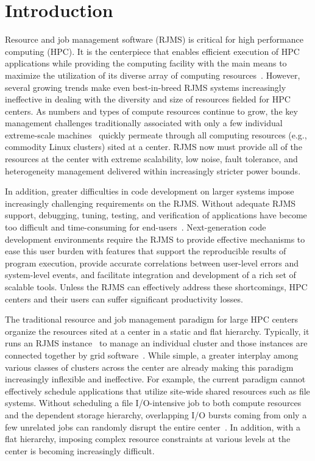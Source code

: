 \section{Introduction}

Resource and job management software (RJMS) is critical
for high performance computing (HPC).
It is the centerpiece that enables efficient
execution of HPC applications while providing
the computing facility with the main means
to maximize the utilization of its diverse array 
of computing resources~\cite{GeorgiouThesis}.
However, several growing trends make even
best-in-breed RJMS systems increasingly
ineffective in dealing with the diversity and size 
of resources fielded for HPC centers.
As numbers and types of compute resources
continue to grow, the key management challenges 
traditionally associated with only a few individual 
extreme-scale machines~\cite{sequoia,titan} 
quickly permeate through all computing resources 
(e.g., commodity Linux clusters) 
sited at a center. 
RJMS now must provide all of the resources at the center
with extreme scalability, low noise, fault tolerance, 
and heterogeneity management delivered 
within increasingly stricter power bounds.

In addition, greater difficulties in code development
on larger systems impose increasingly challenging 
requirements on the RJMS. Without adequate
RJMS support, debugging, tuning, testing, and verification
of applications have become too difficult and 
time-consuming for end-users~\cite{STAT,SPINDLE,PRUNER,SCR,launchmon}.
Next-generation code development environments
require the RJMS to provide effective mechanisms
to ease this user burden with features that support 
the reproducible results of program execution,
provide accurate correlations between user-level errors
and system-level events,
and facilitate integration and development 
of a rich set of scalable tools.
Unless the RJMS can effectively
address these shortcomings, HPC centers and their users 
can suffer significant productivity losses.

The traditional resource and job management paradigm
for large HPC centers organize the resources sited
at a center in a static and flat hierarchy. Typically, it 
runs an RJMS instance~\cite{Jette02slurm} to manage an individual cluster
and those instances are connected together by 
grid software~\cite{MOAB,PSBPro,LSF}.
While simple, a greater interplay 
among various classes of clusters across the center
are already making this paradigm increasingly 
inflexible and ineffective. 
For example, the current paradigm cannot effectively
schedule applications that utilize site-wide shared 
resources such as file systems. 
Without scheduling a file I/O-intensive job 
to both compute resources and the dependent storage 
hierarchy, overlapping I/O bursts coming from only a few
unrelated jobs can randomly disrupt the entire center~\cite{SCR,SPINDLE}. 
In addition, with a flat hierarchy, imposing complex 
resource constraints at various levels at the center
is becoming increasingly difficult. 


